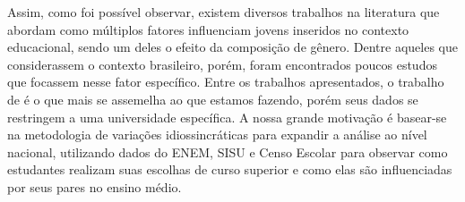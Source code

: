 Assim, como foi possível observar, existem diversos trabalhos na literatura que abordam como múltiplos fatores influenciam jovens inseridos no contexto educacional, sendo um deles o efeito da composição de gênero. Dentre aqueles que considerassem o contexto brasileiro, porém, foram encontrados poucos estudos que focassem nesse fator específico. Entre os trabalhos apresentados, o trabalho de \citet{Borges2021} é o que mais se assemelha ao que estamos fazendo, porém seus dados se restringem a uma universidade específica. A nossa grande motivação é basear-se na metodologia de variações idiossincráticas para expandir a análise ao nível nacional, utilizando dados do ENEM, SISU e Censo Escolar para observar como estudantes realizam suas escolhas de curso superior e como elas são influenciadas por seus pares no ensino médio. 